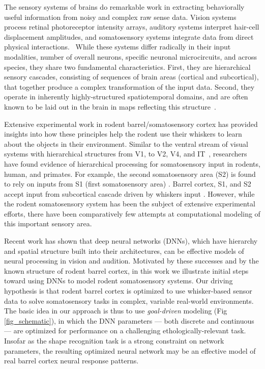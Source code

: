 The sensory systems of brains do remarkable work in extracting behaviorally useful information from noisy and complex raw sense data.
Vision systems process retinal photoreceptor intensity arrays, auditory systems interpret hair-cell displacement amplitudes, and somatosensory systems integrate data from direct physical interactions.~\cite{purves2001neuroscience}
While these systems differ radically in their input modalities, number of overall neurons, specific neuronal microcircuits, and across species, they share two fundamental characteristics.
First, they are hierarchical sensory cascades, consisting of sequences of brain areas (cortical and subcortical), that together produce a complex transformation of the input data.
Second, they operate in inherently highly-structured spatiotemporal domains, and are often known to be laid out in the brain in maps reflecting this structure~\cite{felleman1991distributed}.

Extensive experimental work in rodent barrel/somatosensory cortex has provided insights into how these principles help the rodent use their whiskers to learn about the objects in their environment.
Similar to the ventral stream of visual systems with hierarchical structures from V1, to V2, V4, and IT~\cite{felleman1991distributed, Goodale1992}, researchers have found evidence of hierarchical processing for somatosensory input in rodents, human, and primates\cite{Pons1987, Inui2004, Iwamura1998}.
For example, the second somatosensory area (S2) is found to rely on inputs from S1 (first somatosensory area) \cite{Pons1987, Petersen2007}.
Barrel cortex, S1, and S2 accept input from subcortical cascade driven by  whiskers input \cite{Diamond2008}.
However, while the rodent somatosensory system has been the subject of extensive experimental efforts\cite{armstrong1992flow, petersen2003spatiotemporal, kerr2007spatial, von2007neuronal}, there have been comparatively few attempts at computational modeling of this important sensory area.

Recent work has shown that deep neural networks (DNNs), which have hierarchy and spatial structure built into their architectures, can be effective models of neural processing in vision\cite{cadieu2014deep, Yamins2014} and audition\cite{kell_yamins_sfn}.
Motivated by these successes and by the known structure of rodent barrel cortex, in this work we illustrate initial steps toward using DNNs to model rodent somatosensory systems.
Our driving hypothesis is that rodent barrel cortex is optimized to use whisker-based sensor data to solve somatosensory tasks in complex, variable real-world environments.
The basic idea in our approach is thus to use \emph{goal-driven} modeling (Fig \ref{fig_schematic}), in which the DNN parameters --- both discrete and continuous --- are optimized for performance on a challenging ethologically-relevant task\cite{yamins2016using}.
Insofar as the shape recognition task is a strong constraint on network parameters, the resulting optimized neural network may be an effective model of real barrel cortex neural response patterns.

